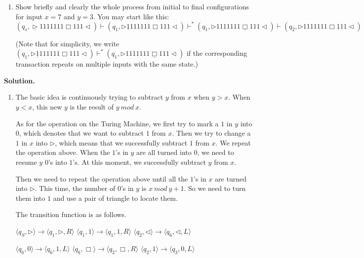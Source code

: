 \documentclass[12pt,a4paper]{article}
\theoremstyle{definition}
\begin{document}
\begin{enumerate}
\begin{enumerate}
	\item
	Show briefly and clearly the whole process from initial to final configurations for input $x = 7$ and $y = 3$. You may start like this:
	$$(q_s,\underline{\triangleright}  1  1  1  1  1  1  1  \Box 1  1  1   \triangleleft)
	\vdash (q_1,\triangleright  \underline{1}  1  1  1  1  1  1  \Box 1  1  1   \triangleleft)
	\vdash^* (q_1,\triangleright  1  1  1  1  1  1  1  \underline{\Box} 1  1  1   \triangleleft)
	\vdash (q_2,\triangleright  1  1  1  1  1  1  1  \Box \underline{1}  1  1   \triangleleft)$$
	
	\par{\color{blue}(Note that for simplicity, we write $(q_1,\triangleright  \underline{1}  1  1  1  1  1  1  \Box 1  1  1   \triangleleft)\vdash^* (q_1,\triangleright  1  1  1  1  1  1  1  \underline{\Box} 1  1  1   \triangleleft)$ if the corresponding transaction repeats on multiple inputs with the same state.)}
	
\end{enumerate}
    \textbf{Solution.}
    \begin{enumerate}
    	\item 
    	    The basic idea is continuously trying to subtract $y$ from $x$ when $y>x$. When $y<x$, this new $y$ is the result of $y\ mod\ x$.
    	    
    	    As for the operation on the Turing Machine, we first try to mark a $1$ in $y$ into $0$, which denotes that we want to subtract $1$ from $x$. Then we try to change a $1$ in $x$ into $\triangleright$, which means that we successfully subtract $1$ from $x$. We repeat the operation above. When the $1$'s in $y$ are all turned into $0$, we need to resume $y$ $0$'s into $1$'s. At this moment, we successfully subtract $y$ from $x$.
    	    
    	    Then we need to repeat the operation above until all the $1$'s in $x$ are turned into $\triangleright$. This time, the number of $0$'s in $y$ is $x\ mod\ y+1$. So we need to turn them into $1$ and use a pair of triangle to locate them.
    	    
    	    The transition function is as follows.
    	    
    	    $\langle q_S, \triangleright \rangle \rightarrow \langle q_1, \triangleright,  R\rangle$\quad
    	    $\langle q_1, 1 \rangle \rightarrow \langle q_1, 1,  R\rangle$\quad
    	    $\langle q_2, \triangleleft \rangle \rightarrow \langle q_6, \triangleleft,  L\rangle$\quad
    	    
    	    $\langle q_6, 0 \rangle \rightarrow \langle q_6, 1,  L\rangle$\quad
    	    $\langle q_6, \Box \rangle \rightarrow \langle q_2, \Box,  R\rangle$\quad
    	    $\langle q_2, 1 \rangle \rightarrow \langle q_3, 0,  L\rangle$\quad
    	     

\end{enumerate}
\end{enumerate}
\end{document}
